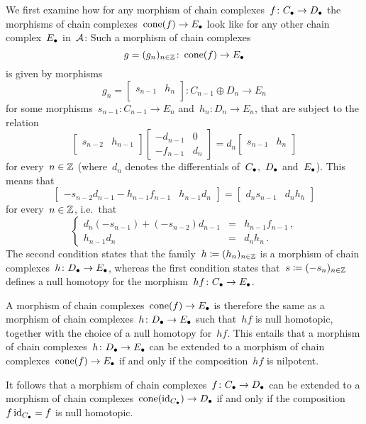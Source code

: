 \section{}


We first examine how for any morphism of chain complexes~$f \colon C_\bullet \to D_\bullet$ the morphisms of chain complexes~$\operatorname{cone}(f) \to E_\bullet$ look like for any other chain complex~$E_\bullet$ in~$\mathcal{A}$:
Such a morphism of chain complexes
\[
          g
  =       (g_n)_{n \in \mathbb{Z}}
  \colon  \operatorname{cone}(f)
  \to     E_\bullet
\]
is given by morphisms
\[
          g_n
  =       \begin{bmatrix}
            s_{n-1} & h_n \\
          \end{bmatrix}
  \colon  C_{n-1} \oplus D_n
  \to     E_n
\]
for some morphisms~$s_{n-1} \colon C_{n-1} \to E_n$ and~$h_n \colon D_n \to E_n$, that are subject to the relation
\[
  \begin{bmatrix}
    s_{n-2} & h_{n-1} \\
  \end{bmatrix}
  \begin{bmatrix}
    -d_{n-1}  & 0   \\
    -f_{n-1}  & d_n
  \end{bmatrix}
  =
  d_n
  \begin{bmatrix}
    s_{n-1} & h_n \\
  \end{bmatrix}
\]
for every~$n \in \mathbb{Z}$ (where~$d_n$ denotes the differentials of~$C_\bullet$,~$D_\bullet$ and~$E_\bullet$).
This means that
\[
  \begin{bmatrix}
    - s_{n-2} d_{n-1} - h_{n-1} f_{n-1} & h_{n-1} d_n
  \end{bmatrix}
  =
  \begin{bmatrix}
    d_n s_{n-1} & d_n h_h
  \end{bmatrix}
\]
for every~$n \in \mathbb{Z}$, i.e.\ that
\[
  \left\{
    \begin{array}{rcl}
      d_n (-s_{n-1}) + (-s_{n-2}) d_{n-1} &=&  h_{n-1} f_{n-1} \,,  \\
      h_{n-1} d_n                         &=& d_n h_n \,.
    \end{array}
  \right.
\]
The second condition states that the family~$h \coloneqq (h_n)_{n \in \mathbb{Z}}$ is a morphism of chain complexes~$h \colon D_\bullet \to E_\bullet$, whereas the first condition states that~$s \coloneqq (-s_n)_{n \in \mathbb{Z}}$ defines a null homotopy for the morphism~$hf \colon C_\bullet \to E_\bullet$.

A morphism of chain complexes~$\operatorname{cone}(f) \to E_\bullet$ is therefore the same as a morphism of chain complexes~$h \colon D_\bullet \to E_\bullet$ such that~$hf$ is null homotopic, together with the choice of a null homotopy for~$hf$.
This entails that a morphism of chain complexes~$h \colon D_\bullet \to E_\bullet$ can be extended to a morphism of chain complexes~$\operatorname{cone}(f) \to E_\bullet$ if and only if the composition~$hf$ is nilpotent.

It follows that a morphism of chain complexes~$f \colon C_\bullet \to D_\bullet$ can be extended to a morphism of chain complexes~$\operatorname{cone}(\operatorname{id}_{C_\bullet}) \to D_\bullet$ if and only if the composition~$f \operatorname{id}_{C_\bullet} = f$ is null homotopic.




